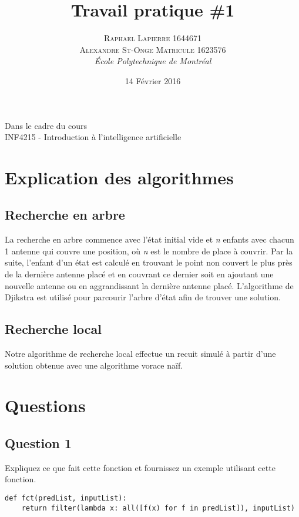 \documentclass[a4paper, 12pt]{article} %
\title{Travail pratique \#1}
\author{\textsc{Raphael Lapierre 1644671\\
	        Alexandre St-Onge Matricule 1623576} %
\vspace{10pt}
\\{\textit{École Polytechnique de Montréal}}} %
\date{14 Février 2016} %
\makeatletter
\renewcommand{\maketitle}{ %
\begin{center} %

\vspace*{25pt} %
{\LARGE\@title} %

\vspace{125pt} %

{\large\@author} %

\vspace{125pt} %
Dans le cadre du cours
\\INF4215 - Introduction à l'intelligence artificielle
\vspace{125pt} %
\\\@date %
\vspace{125pt} %

\end{center}
}
\makeatother
\begin{document}
\thispagestyle{empty}
\clearpage\maketitle %
\pagebreak[4]

\setlength{\headheight}{15.0pt}
\pagestyle{fancy}
\fancyhead[C]{}

\section*{Explication des algorithmes}

\subsection*{Recherche en arbre}
La recherche en arbre commence avec l'état initial vide et \emph{n} enfants avec chacun 1 antenne qui couvre une position, où \emph{n} est le nombre de place à couvrir.
Par la suite, l'enfant d'un état est calculé en trouvant le point non couvert le plus près de la dernière antenne placé et en couvrant ce dernier soit en ajoutant une nouvelle 
antenne ou en aggrandissant la dernière antenne placé. L'algorithme de Djikstra est utilisé pour parcourir l'arbre d'état afin de trouver une solution.

\subsection*{Recherche local}
Notre algorithme de recherche local effectue un recuit simulé à partir d'une solution obtenue avec une algorithme vorace naïf. 

\section*{Questions}

\subsection*{Question 1}
Expliquez ce que fait cette fonction et fournissez un exemple utilisant cette fonction.
\begin{lstlisting}
def fct(predList, inputList):
	return filter(lambda x: all([f(x) for f in predList]), inputList)
\end{lstlisting}
\end{document}
